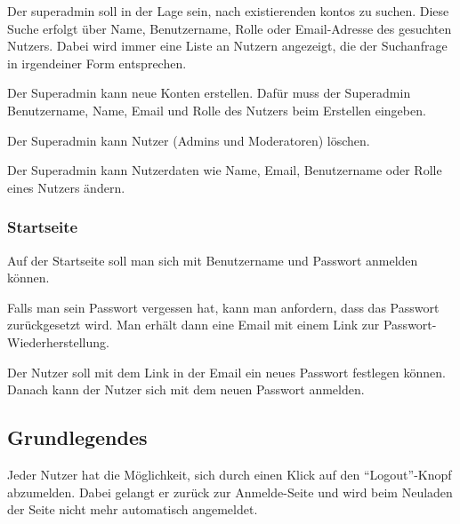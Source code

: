\documentclass[parskip=full,11pt,twoside]{scrartcl}
\begin{document}
Der \Gls{superadmin} soll in der Lage sein, nach existierenden \Glspl{konto} zu suchen. Diese Suche erfolgt über Name, Benutzername, Rolle oder Email-Adresse des gesuchten Nutzers. Dabei wird immer eine Liste an Nutzern angezeigt, die der Suchanfrage in irgendeiner Form entsprechen.

Der Superadmin kann neue Konten erstellen. Dafür muss der Superadmin Benutzername, Name, Email und Rolle des Nutzers beim Erstellen eingeben.


Der Superadmin kann Nutzer (Admins und Moderatoren) löschen. 

Der Superadmin kann Nutzerdaten wie Name, Email, Benutzername oder Rolle eines Nutzers ändern.

\subsubsection{Startseite}

Auf der Startseite soll man sich mit Benutzername und Passwort anmelden können.


Falls man sein Passwort vergessen hat, kann man anfordern, dass das Passwort zurückgesetzt wird. Man erhält dann eine Email mit einem Link zur Passwort-Wiederherstellung.  

Der Nutzer soll mit dem Link in der Email ein neues Passwort festlegen können. Danach kann der Nutzer sich mit dem neuen Passwort anmelden.


\subsection{Grundlegendes}

Jeder Nutzer hat die Möglichkeit, sich durch einen Klick auf den \enquote{Logout}-Knopf abzumelden. Dabei gelangt er zurück zur Anmelde-Seite und wird beim Neuladen der Seite nicht mehr automatisch angemeldet.
\end{document}

